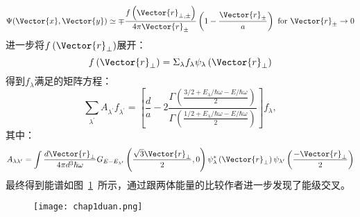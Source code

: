 \begin{equation}
\Psi(\Vector{x}, \Vector{y}) \simeq \mp \frac{f\left(\Vector{r}_{\perp, \pm}\right)}{4 \pi \Vector{r}_{\pm}}\left(1-\frac{\Vector{r}_{\pm}}{a}\right) \text { for } \Vector{r}_{\pm} \rightarrow 0
\end{equation}
进一步将$f\left(\Vector{r}_{\perp}\right)$展开：
\begin{equation}
f\left(\Vector{r}_{\perp}\right)=\Sigma_{\lambda} f_{\lambda} \psi_{\lambda}\left(\Vector{r}_{\perp}\right)
\end{equation}
得到$f_\lambda$满足的矩阵方程：
\begin{equation}
\sum_{\lambda^{\prime}} A_{\lambda^{\prime}} f_{\lambda^{\prime}}=\left[\frac{d}{a}-2 \frac{\Gamma\left(\frac{3 / 2+E_{\lambda} / \hbar \omega-E / \hbar \omega}{2}\right)}{\Gamma\left(\frac{1 / 2+E_{\lambda} / \hbar \omega-E / \hbar \omega}{2}\right)}\right] f_{\lambda},
\end{equation}
其中：
\begin{equation}
A_{\lambda \lambda^{\prime}}=\int \frac{d \Vector{r}_{\perp}}{4 \pi d^{3} \hbar \omega} G_{E-E_{\lambda^{\prime}}}\left(\frac{\sqrt{3} \Vector{r}_{\perp}}{2}, 0\right) \psi_{\lambda}^{*}\left(\Vector{r}_{\perp}\right) \psi_{\lambda^{\prime}}\left(\frac{-\Vector{r}_{\perp}}{2}\right)
\end{equation}
最终得到能谱如图~\ref{duancrossing}~所示，通过跟两体能量的比较作者进一步发现了能级交叉。
\begin{figure}[!htbp]
    \centering
    \texttt{[image: chap1duan.png]}
    \label{duancrossing}
\end{figure}

